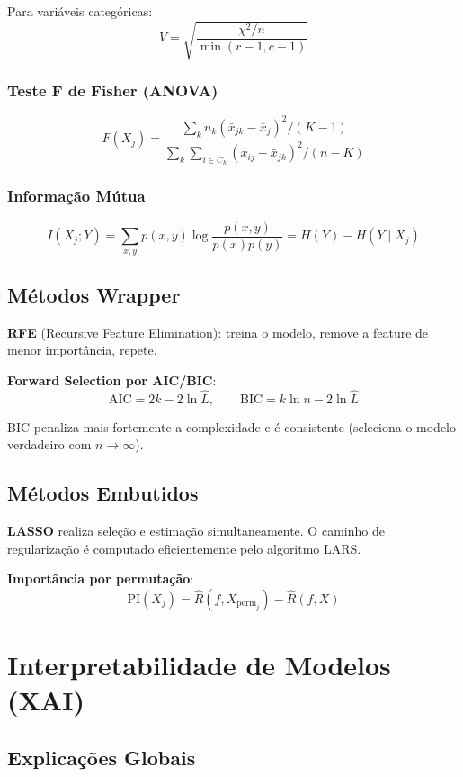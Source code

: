 \documentclass[12pt,a4paper,twoside]{book}
\theoremstyle{definition}
\theoremstyle{remark}
\begin{document}
Para variáveis categóricas:
\[
V = \sqrt{\frac{\chi^2/n}{\min(r-1,c-1)}}
\]

\subsection{Teste F de Fisher (ANOVA)}

\[
F(X_j) = \frac{\sum_k n_k(\bar{x}_{jk} - \bar{x}_j)^2 / (K-1)}{\sum_k \sum_{i \in C_k}(x_{ij} - \bar{x}_{jk})^2 / (n-K)}
\]

\subsection{Informação Mútua}

\[
I(X_j; Y) = \sum_{x,y} p(x,y)\log\frac{p(x,y)}{p(x)p(y)} = H(Y) - H(Y \mid X_j)
\]

\section{Métodos Wrapper}

\textbf{RFE} (Recursive Feature Elimination): treina o modelo, remove a feature de menor importância, repete.

\textbf{Forward Selection por AIC/BIC}:
\[
\mathrm{AIC} = 2k - 2\ln\hat{L}, \qquad \mathrm{BIC} = k\ln n - 2\ln\hat{L}
\]

BIC penaliza mais fortemente a complexidade e é consistente (seleciona o modelo verdadeiro com $n \to \infty$).

\section{Métodos Embutidos}

\textbf{LASSO} realiza seleção e estimação simultaneamente. O caminho de regularização é computado eficientemente pelo algoritmo LARS.

\textbf{Importância por permutação}:
\[
\mathrm{PI}(X_j) = \hat{R}(f, X_{\mathrm{perm}_j}) - \hat{R}(f, X)
\]

\chapter{Interpretabilidade de Modelos (XAI)}

\section{Explicações Globais}
\end{document}
